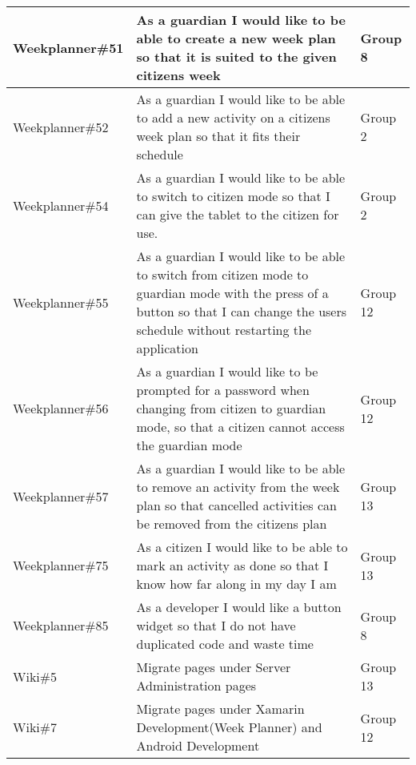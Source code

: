 \begin{longtable}{|p{2.8cm}|p{7cm}|p{2cm}|}
    Weekplanner\#51 & As a guardian I would like to be able to create a new week plan so that it is suited to the given citizens week                                                                          & Group 8             \\ \hline
    Weekplanner\#52 & As a guardian I would like to be able to add a new activity on a citizens week plan so that it fits their schedule                                                                       & Group 2             \\ \hline
    Weekplanner\#54 & As a guardian I would like to be able to switch to citizen mode so that I can give the tablet to the citizen for use.                                                                    & Group 2             \\ \hline
    Weekplanner\#55 & As a guardian I would like to be able to switch from citizen mode to guardian mode with the press of a button so that I can change the users schedule without restarting the application & Group 12            \\ \hline
    Weekplanner\#56 & As a guardian I would like to be prompted for a password when changing from citizen to guardian mode, so that a citizen cannot access the guardian mode                                  & Group 12            \\ \hline
    Weekplanner\#57 & As a guardian I would like to be able to remove an activity from the week plan so that cancelled activities can be removed from the citizens plan                                        & Group 13            \\ \hline
    Weekplanner\#75 & As a citizen I would like to be able to mark an activity as done so that I know how far along in my day I am                                                                             & Group 13            \\ \hline
    Weekplanner\#85 & As a developer I would like a button widget so that I do not have duplicated code and waste time                                                                                         & Group 8             \\ \hline
    Wiki\#5         & Migrate pages under Server Administration pages                                                                                                                                          & Group 13            \\ \hline
    Wiki\#7         & Migrate pages under Xamarin Development(Week Planner) and Android Development                                                                                                            & Group 12            \\ \hline

\end{longtable}
